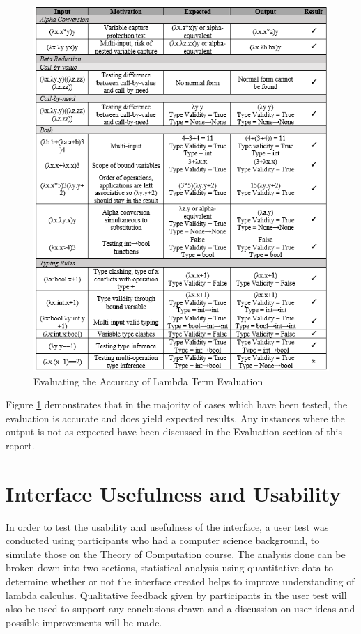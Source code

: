 \documentclass[a4paper,11pt]{report}
\begin{document}
\begin{figure}[p]
	\includegraphics[scale=1.3]{images/Testing_Log}
	\centering
	\caption{Evaluating the Accuracy of Lambda Term Evaluation}
	\label{testing_log}
\end{figure}

Figure \ref{testing_log} demonstrates that in the majority of cases which have been tested, the evaluation is accurate and does yield expected results. Any instances where the output is not as expected have been discussed in the Evaluation section of this report.

\section{Interface Usefulness and Usability}

In order to test the usability and usefulness of the interface, a user test was conducted using participants who had a computer science background, to simulate those on the Theory of Computation course. The analysis done can be broken down into two sections, statistical analysis using quantitative data to determine whether or not the interface created helps to improve understanding of lambda calculus. Qualitative feedback given by participants in the user test will also be used to support any conclusions drawn and a discussion on user ideas and possible improvements will be made.
\label{interface usefulness and usability}
\end{document}
